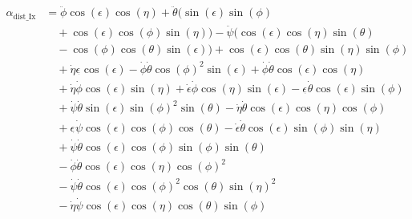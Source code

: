 \documentclass[letterpaper, 10 pt, conference]{ieeeconf}  %
\begin{document}
\begin{equation}
  \begin{aligned}
    \alpha_{\text{dist\_Ix}} & = \ddot{\phi}\cos(\epsilon)\cos(\eta) + \ddot{\theta}(\sin(\epsilon)\sin(\phi)                                                                                 \\
                             & \quad  + \cos(\epsilon)\cos(\phi)\sin(\eta)) - \ddot{\psi}(\cos(\epsilon)\cos(\eta)\sin(\theta)                                                                \\
                             & \quad - \cos(\phi)\cos(\theta)\sin(\epsilon)) + \cos(\epsilon)\cos(\theta)\sin(\eta)\sin(\phi)                                                                 \\
                             & \quad  + \dot{\eta}\epsilon_{\dot{}}\cos(\epsilon)  - \dot{\phi}\dot{\theta}\cos(\phi)^2\sin(\epsilon) + \dot{\phi}\dot{\theta}\cos(\epsilon)\cos(\eta)        \\
                             & \quad  + \dot{\eta}\dot{\phi}\cos(\epsilon)\sin(\eta) + \dot\epsilon\dot{\phi}\cos(\eta)\sin(\epsilon) - \epsilon_{\dot{}}\dot{\theta}\cos(\epsilon)\sin(\phi) \\
                             & \quad + \dot{\psi}\dot{\theta}\sin(\epsilon)\sin(\phi)^2\sin(\theta) - \dot{\eta}\dot{\theta}\cos(\epsilon)\cos(\eta)\cos(\phi)                                \\
                             & \quad + \epsilon_{\dot{}}\dot{\psi}\cos(\epsilon)\cos(\phi)\cos(\theta) - \dot\epsilon\dot{\theta}\cos(\epsilon)\sin(\phi)\sin(\eta)                           \\
                             & \quad + \dot{\psi}\dot{\theta}\cos(\epsilon)\cos(\phi)\sin(\phi)\sin(\theta)                                                                                   \\
                             & \quad - \dot{\phi}\dot{\theta}\cos(\epsilon)\cos(\eta)\cos(\phi)^2                                                                                             \\
                             & \quad - \dot{\psi}\dot{\theta}\cos(\epsilon)\cos(\phi)^2\cos(\theta)\sin(\eta)^2                                                                               \\
                             & \quad - \dot{\eta}\dot{\psi}\cos(\epsilon)\cos(\eta)\cos(\theta)\sin(\phi)                                                                                     \\

\end{aligned}
\end{equation}
\end{document}
